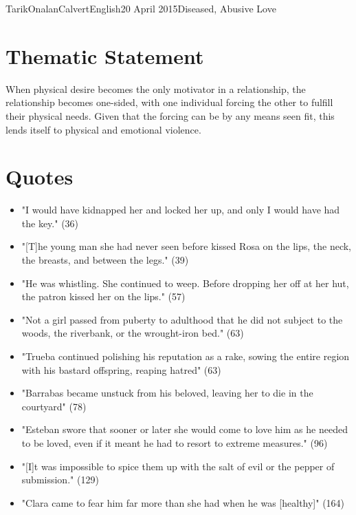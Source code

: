 \documentclass[12pt,a4paper]{article}
\begin{document}
    \begin{mla}{Tarik}{Onalan}{Calvert}{English}{20 April 2015}{Diseased, Abusive Love}
        \section{Thematic Statement}
            \noindent
            When physical desire becomes the only motivator in a relationship, the
            relationship becomes one-sided, with one individual forcing the other
            to fulfill their physical needs. Given that the forcing can be by any
            means seen fit, this lends itself to physical and emotional violence.
        \section{Quotes}
            \begin{itemize}
                \item "I would have kidnapped her and locked her up, and only I would have had
                    the key." (36)
                \item "[T]he young man she had never seen before kissed Rosa on the lips,
                    the neck, the breasts, and between the legs." (39)
                \item "He was whistling. She continued to weep. Before dropping her off at
                    her hut, the patron kissed her on the lips." (57)
                \item "Not a girl passed from puberty to adulthood that he did not subject
                    to the woods, the riverbank, or the wrought-iron bed." (63)
                \item "Trueba continued polishing his reputation as a rake, sowing the
                    entire region with his bastard offspring, reaping hatred" (63)
                \item "Barrabas became unstuck from his beloved, leaving her to die in the
                    courtyard" (78)
                \item "Esteban swore that sooner or later she would come to love him as he
                    needed to be loved, even if it meant he had to resort to extreme measures." (96)
                \item "[I]t was impossible to spice them up with the salt of evil or the
                    pepper of submission." (129)
                \item "Clara came to fear him far more than she had when he was [healthy]" (164)

\end{itemize}
\end{mla}
\end{document}
